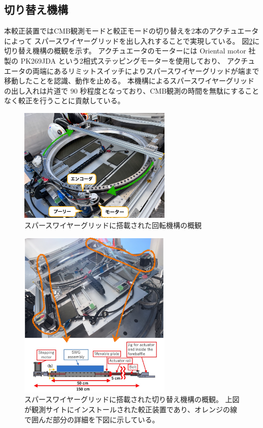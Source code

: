 \documentclass[../../main.tex]{subfiles}
\begin{document}
\subsection{切り替え機構}
本較正装置ではCMB観測モードと較正モードの切り替えを2本のアクチュエータによって
スパースワイヤーグリッドを出し入れすることで実現している。
図\ref{fig:gridloader}に切り替え機構の概観を示す。
アクチュエータのモーターには Oriental motor 社製の PK269JDA という2相式ステッピングモーターを使用しており、
アクチュエータの両端にあるリミットスイッチによりスパースワイヤーグリッドが端まで移動したことを認識、動作を止める。
本機構によるスパースワイヤーグリッドの出し入れは片道で $90$ 秒程度となっており、CMB観測の時間を無駄にすることなく較正を行うことに貢献している\cite{swg:nakata}。
\begin{figure}[H]
    \centering
    \includegraphics[width=0.65\textwidth]{wiregrid/rotation_parts.pdf}
    \caption{スパースワイヤーグリッドに搭載された回転機構の概観}
    \label{fig:rotation_parts}
\end{figure}
\begin{figure}[H]
    \centering
    \includegraphics[width=0.65\textwidth]{wiregrid/wiregrid_actuator.pdf}
    \caption[スパースワイヤーグリッドに搭載された切り替え機構の概観]{スパースワイヤーグリッドに搭載された切り替え機構の概観。
    上図が観測サイトにインストールされた較正装置であり、オレンジの線で囲んだ部分の詳細を下図に示している。}
    \label{fig:gridloader}
\end{figure}
\end{document}
